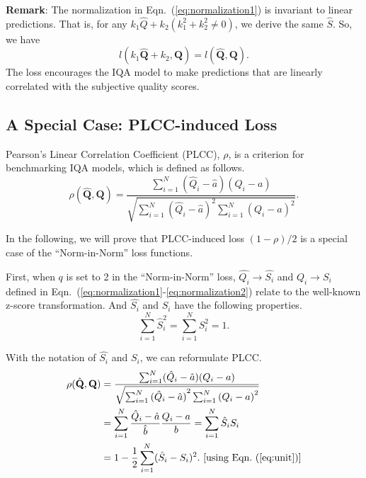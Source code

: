 \documentclass[sigconf]{acmart}
\begin{document}
\noindent\textbf{Remark}: The normalization in Eqn.~(\ref{eq:normalization1}) is invariant to linear predictions. 
That is, for any $k_1\hat{Q}+k_2 (k_1^2+k_2^2\neq 0)$, we derive the same $\hat{S}$.
So, we have
\begin{equation}
    l(k_1\hat{\mathbf{Q}}+k_2, \mathbf{Q}) = l(\hat{\mathbf{Q}}, \mathbf{Q}).
\end{equation}
The loss encourages the IQA model to make predictions that are linearly correlated with the subjective quality scores.

\subsection{A Special Case: PLCC-induced Loss}
Pearson's Linear Correlation Coefficient (PLCC), $\rho$, is a criterion for benchmarking IQA models, which is defined as follows.
\begin{equation}\label{eq:plcc}
\rho(\hat{\mathbf{Q}}, {\mathbf{Q}}) =\frac{\sum_{i=1}^N(\hat{Q}_{i}-\hat{a})(Q_{i}-a)}{\sqrt{\sum_{i=1}^N{(\hat{Q}_{i}-\hat{a})}^2\sum_{i=1}^N{(Q_{i}-a)}^2}}.
\end{equation}

In the following, we will prove that PLCC-induced loss $(1-\rho)/2$ is a special case of the ``Norm-in-Norm'' loss functions.

First, when $q$ is set to 2 in the ``Norm-in-Norm'' loss, $\hat{Q_i}\rightarrow\hat{S_i}$ and ${Q_i}\rightarrow{S_i}$ defined in Eqn.~(\ref{eq:normalization1}-\ref{eq:normalization2}) relate to the well-known z-score transformation. 
And $\hat{S_i}$ and ${S_i}$ have the following properties.
\begin{equation}\label{eq:unit}
    \sum_{i=1}^N \hat{S}_{i}^{2}=\sum_{i=1}^N {S}_{i}^{2}=1.
\end{equation}

With the notation of $\hat{S_i}$ and $S_i$, we can reformulate PLCC.
\begin{align}\label{eq:aloss}
\rho(\hat{\mathbf{Q}}, {\mathbf{Q}}) &=\frac{\sum_{i=1}^N(\hat{Q}_{i}-\hat{a})(Q_{i}-a)}{\sqrt{\sum_{i=1}^N{(\hat{Q}_{i}-\hat{a})}^2\sum_{i=1}^N{(Q_{i}-a)}^2}} \nonumber\\
& =\sum_{i=1}^N\frac{\hat{Q}_{i}-\hat{a}}{\hat{b}}\frac{Q_{i}-a}{b}=\sum_{i=1}^N\hat{S}_{i}S_i\nonumber\\
&=1-\frac{1}{2}\sum_{i=1}^N(\hat{S}_{i}-S_i)^2.\ \mbox{[using Eqn.~(\ref{eq:unit})]} \nonumber
\end{align}
\end{document}
